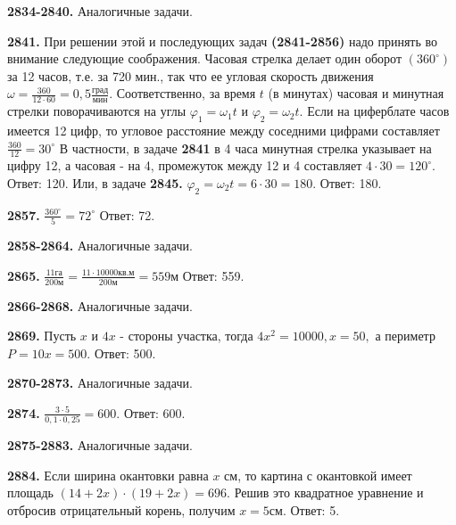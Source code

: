 \textbf{2834-2840.} Аналогичные задачи.

\textbf{2841.} При решении этой и последующих задач \textbf{(2841-2856)} надо принять во внимание следующие соображения. Часовая стрелка делает один оборот $(360^\circ)$ за 12 часов, т.е. за 720 мин., так что  ее угловая скорость движения $\omega=\frac{360}{12\cdot60}=0,5\frac{\text{град}}{\text{мин}}.$ Соответственно, за время $t$ (в минутах) часовая и минутная стрелки поворачиваются на углы $\varphi_1=\omega_1t$ и $\varphi_2=\omega_2t$. Если на циферблате часов имеется 12 цифр, то угловое расстояние между соседними цифрами составляет $\frac{360}{12}=30^\circ$
В частности, в задаче \textbf{2841} в 4 часа минутная стрелка указывает на цифру 12, а часовая - на 4, промежуток между 12 и 4 составляет $4\cdot30=120^\circ$. \newline \null \hspace*{\fill} Ответ: 120. \newline
Или, в задаче \textbf{2845.} $\varphi_2=\omega_2t=6\cdot30=180.$ \newline \null \hspace*{\fill} Ответ: 180. 

\textbf{2857.} $\frac{360^\circ}{5}=72^\circ$ \newline \null \hspace*{\fill} Ответ: 72. 

\textbf{2858-2864.} Аналогичные задачи.

\textbf{2865.} $\frac{11\text{га}}{200\text{м}}=\frac{11\cdot10000\text{кв.м}}{200\text{м}}=559\text{м}$ \newline \null \hspace*{\fill} Ответ: 559. 

\textbf{2866-2868.} Аналогичные задачи.

\textbf{2869.} Пусть $x$ и $4x$ - стороны участка, тогда $4x^2=10000, x=50,$ а периметр $P = 10x = 500.$ \newline \null \hspace*{\fill}Ответ: 500.

\textbf{2870-2873.} Аналогичные задачи.

\textbf{2874.} $\frac{3\cdot5}{0,1\cdot0,25}=600.$ \newline \null \hspace*{\fill} Ответ: 600. 

\textbf{2875-2883.} Аналогичные задачи.

\textbf{2884.} Если ширина окантовки равна $x$ см, то картина с окантовкой имеет площадь $(14+2x)\cdot(19+2x)=696.$ Решив это квадратное уравнение и отбросив отрицательный корень, получим $x=5\text{см}.$ \newline \null \hspace*{\fill} Ответ: 5. 

